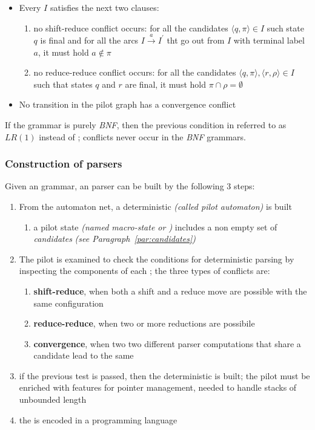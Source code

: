 \documentclass[english]{article}
\begin{document}
\begin{itemize}
  \item Every \mstate \(I\) satisfies the next two clauses:
        \begin{enumerate}
          \item no shift-reduce conflict occurs: for all the candidates \(\langle q, \pi \rangle \in I\) such state \(q\) is final and for all the arcs \(I \xrightarrow{a} I^\prime\) tht go out from \(I\) with terminal label \(a\), it must hold \(a \notin \pi\)
          \item no reduce-reduce conflict occurs: for all the candidates \(\langle q, \pi \rangle, \langle r, \rho \rangle \in I\) such that states \(q\) and \(r\) are final, it must hold \(\pi \cap \rho = \emptyset\)
        \end{enumerate}
  \item No transition in the pilot graph has a convergence conflict
\end{itemize}

If the grammar is purely \textit{BNF}, then the previous condition in referred to as \(\textit{LR}(1)\) instead of \ELRo;
conflicts never occur in the \textit{BNF} grammars.

\subsubsection[Construction of ELR(1) parser]{Construction of \ELRo parsers}

Given an \EBNF grammar, an \ELRo parser can be built by the following \(3\) steps:

\begin{enumerate}
  \item From the automaton net, a deterministic \FSA \textit{(called pilot automaton)} is built
        \begin{enumerate}
          \item a pilot state \textit{(named macro-state or \mstate)} includes a non empty set of \textit{candidates} \textit{(see Paragraph~\ref{par:candidates})}
        \end{enumerate}
  \item The pilot is examined to check the conditions for deterministic parsing by inspecting the components of each \mstate; the three types of conflicts are:
        \begin{enumerate}
          \item \textbf{shift-reduce}, when both a shift and a reduce move are possible with the same configuration
          \item \textbf{reduce-reduce}, when two or more reductions are possibile
          \item \textbf{convergence}, when two two different parser computations that share a candidate lead to the same \mstate
        \end{enumerate}
  \item if the previous test is passed, then the deterministic \PDA is built; the pilot \FSA must be enriched with features for pointer management, needed to handle stacks of unbounded length
  \item the \PDA is encoded in a programming language
\end{enumerate}
\end{document}
